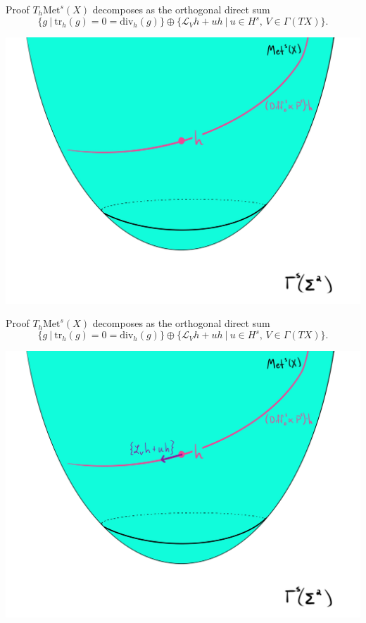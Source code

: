 \documentclass[professionalfont]{beamer}
\begin{document}



\begin{frame}{Proof}
$T_h\mathrm{Met}^s(X)$ decomposes as the orthogonal direct sum 
\[
\{ g \ | \ \mathrm{tr}_h (g) = 0 = \mathrm{div}_h(g) \} \oplus \{\mathcal{L}_V h + u h \ |\ u \in H^s \text{, } V \in \Gamma(TX) \}.
\]  

\centering\includegraphics[scale=0.09]{Tangent-3.jpg}

\end{frame}





\begin{frame}{Proof}
$T_h\mathrm{Met}^s(X)$ decomposes as the orthogonal direct sum 
\[
\{ g \ | \ \mathrm{tr}_h (g) = 0 = \mathrm{div}_h(g) \} \oplus \{\mathcal{L}_V h + u h \ |\ u \in H^s \text{, } V \in \Gamma(TX) \}.
\]  

\centering\includegraphics[scale=0.09]{Tangent-4.jpg}

\end{frame}
\end{document}

